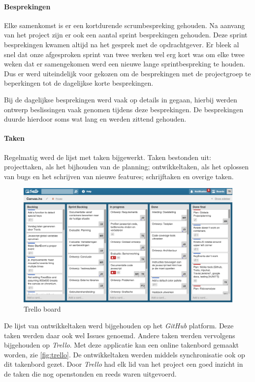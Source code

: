 \paragraph{Besprekingen} Elke samenkomst is er een kortdurende scrumbespreking gehouden. Na aanvang van het project zijn er ook een aantal sprint besprekingen gehouden. Deze sprint besprekingen kwamen altijd na het gesprek met de opdrachtgever. Er bleek al snel dat onze afgesproken sprint van twee werken wel erg kort was om elke twee weken dat er samengekomen werd een nieuwe lange sprintbespreking te houden. Dus er werd uiteindelijk voor gekozen om de besprekingen met de projectgroep te beperkingen tot de dagelijkse korte besprekingen.

Bij de dagelijkse besprekingen werd vaak op details in gegaan, hierbij werden ontwerp beslissingen vaak genomen tijdens deze besprekingen. De besprekingen duurde hierdoor soms wat lang en werden zittend gehouden.

\paragraph{Taken}
Regelmatig werd de lijst met taken bijgewerkt. Taken bestonden uit: projecttaken, als het bijhouden van de planning; ontwikkeltaken, als het oplossen van bugs en het schrijven van nieuwe features; schrijftaken en overige taken.

\begin{figure}[H]
\begin{center}
\includegraphics[keepaspectratio,width=\textwidth]{./images/trello.png}
\caption{Trello board}
\label{fig:trello}
\end{center}
\end{figure}

De lijst van ontwikkeltaken werd bijgehouden op het \emph{GitHub} platform. Deze taken werden daar ook wel Issues genoemd. Andere taken werden vervolgens bijgehouden op \emph{Trello}. Met deze applicatie kan een online takenbord gemaakt worden, zie \autoref{fig:trello}. De ontwikkeltaken werden middels synchronisatie ook op dit takenbord gezet. Door \emph{Trello} had elk lid van het project een goed inzicht in de taken die nog openstonden en reeds waren uitgevoerd.

